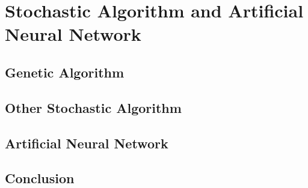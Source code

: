 
\chapter{Stochastic Algorithm and Artificial Neural Network} %

\label{Chapter3} %


\section{Genetic Algorithm}
\section{Other Stochastic Algorithm}

\section{Artificial Neural Network}
\section{Conclusion}

